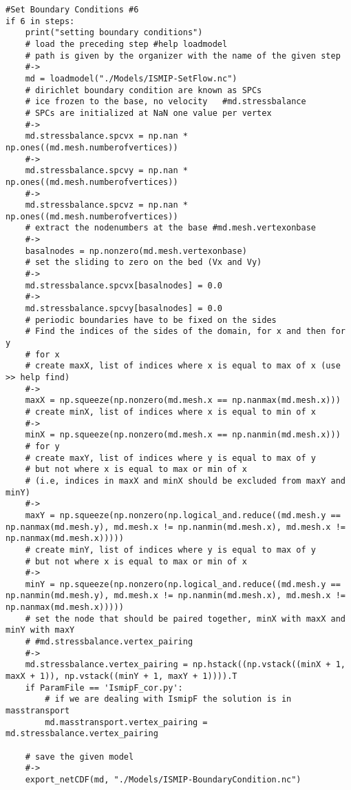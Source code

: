 \begin{verbatim}
#Set Boundary Conditions #6
if 6 in steps:
    print("setting boundary conditions")
    # load the preceding step #help loadmodel
    # path is given by the organizer with the name of the given step
    #->
    md = loadmodel("./Models/ISMIP-SetFlow.nc")
    # dirichlet boundary condition are known as SPCs
    # ice frozen to the base, no velocity   #md.stressbalance
    # SPCs are initialized at NaN one value per vertex
    #->
    md.stressbalance.spcvx = np.nan * np.ones((md.mesh.numberofvertices))
    #->
    md.stressbalance.spcvy = np.nan * np.ones((md.mesh.numberofvertices))
    #->
    md.stressbalance.spcvz = np.nan * np.ones((md.mesh.numberofvertices))
    # extract the nodenumbers at the base #md.mesh.vertexonbase
    #->
    basalnodes = np.nonzero(md.mesh.vertexonbase)
    # set the sliding to zero on the bed (Vx and Vy)
    #->
    md.stressbalance.spcvx[basalnodes] = 0.0
    #->
    md.stressbalance.spcvy[basalnodes] = 0.0
    # periodic boundaries have to be fixed on the sides
    # Find the indices of the sides of the domain, for x and then for y
    # for x
    # create maxX, list of indices where x is equal to max of x (use >> help find)
    #->
    maxX = np.squeeze(np.nonzero(md.mesh.x == np.nanmax(md.mesh.x)))
    # create minX, list of indices where x is equal to min of x
    #->
    minX = np.squeeze(np.nonzero(md.mesh.x == np.nanmin(md.mesh.x)))
    # for y
    # create maxY, list of indices where y is equal to max of y
    # but not where x is equal to max or min of x
    # (i.e, indices in maxX and minX should be excluded from maxY and minY)
    #->
    maxY = np.squeeze(np.nonzero(np.logical_and.reduce((md.mesh.y == np.nanmax(md.mesh.y), md.mesh.x != np.nanmin(md.mesh.x), md.mesh.x != np.nanmax(md.mesh.x)))))
    # create minY, list of indices where y is equal to max of y
    # but not where x is equal to max or min of x
    #->
    minY = np.squeeze(np.nonzero(np.logical_and.reduce((md.mesh.y == np.nanmin(md.mesh.y), md.mesh.x != np.nanmin(md.mesh.x), md.mesh.x != np.nanmax(md.mesh.x)))))
    # set the node that should be paired together, minX with maxX and minY with maxY
    # #md.stressbalance.vertex_pairing
    #->
    md.stressbalance.vertex_pairing = np.hstack((np.vstack((minX + 1, maxX + 1)), np.vstack((minY + 1, maxY + 1)))).T
    if ParamFile == 'IsmipF_cor.py':
        # if we are dealing with IsmipF the solution is in masstransport
        md.masstransport.vertex_pairing = md.stressbalance.vertex_pairing

    # save the given model
    #->
    export_netCDF(md, "./Models/ISMIP-BoundaryCondition.nc")


\end{verbatim}
